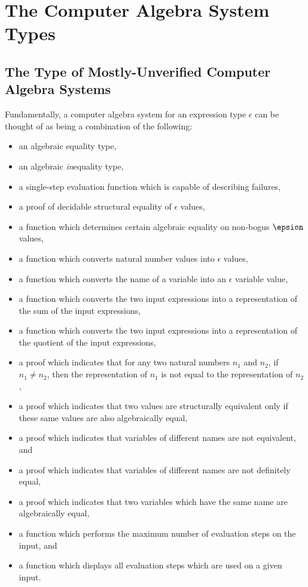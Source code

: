 \documentclass{report}
\begin{document}
\chapter{The Computer Algebra System Types}

\section{The Type of Mostly-Unverified Computer Algebra Systems}
Fundamentally, a computer algebra system for an expression type \(\epsilon\) can be thought of as being a combination of the following:

\begin{itemize}
  \item an algebraic equality type,
  \item an algebraic \emph{in}equality type,
  \item a single-step evaluation function which is capable of describing failures,
  \item a proof of decidable structural equality of \(\epsilon\) values,
  \item a function which determines certain algebraic equality on non-bogus \(\epsion\) values,
  \item a function which converts natural number values into \(\epsilon\) values,
  \item a function which converts the name of a variable into an \(\epsilon\) variable value,
  \item a function which converts the two input expressions into a representation of the sum of the input expressions,
  \item a function which converts the two input expressions into a representation of the quotient of the input expressions,
  \item a proof which indicates that for any two natural numbers \(n_1\) and \(n_2\), if \(n_1 \neq n_2\), then the representation of \(n_1\) is not equal to the representation of \(n_2\),
  \item a proof which indicates that two values are structurally equivalent only if these same values are also algebraically equal,
  \item a proof which indicates that variables of different names are not equivalent, and
  \item a proof which indicates that variables of different names are not definitely equal,
  \item a proof which indicates that two variables which have the same name are algebraically equal,
  \item a function which performs the maximum number of evaluation steps on the input, and
  \item a function which displays all evaluation steps which are used on a given input.
\end{itemize}
\end{document}
